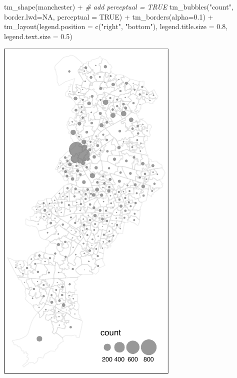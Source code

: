 \documentclass[
]{book}
\newenvironment{Shaded}{\begin{snugshade}}{\end{snugshade}}
\newcommand{\AttributeTok}[1]{\textcolor[rgb]{0.77,0.63,0.00}{#1}}
\newcommand{\CommentTok}[1]{\textcolor[rgb]{0.56,0.35,0.01}{\textit{#1}}}
\newcommand{\ConstantTok}[1]{\textcolor[rgb]{0.00,0.00,0.00}{#1}}
\newcommand{\FloatTok}[1]{\textcolor[rgb]{0.00,0.00,0.81}{#1}}
\newcommand{\FunctionTok}[1]{\textcolor[rgb]{0.00,0.00,0.00}{#1}}
\newcommand{\NormalTok}[1]{#1}
\newcommand{\SpecialCharTok}[1]{\textcolor[rgb]{0.00,0.00,0.00}{#1}}
\newcommand{\StringTok}[1]{\textcolor[rgb]{0.31,0.60,0.02}{#1}}
\begin{document}
\begin{Shaded}
\begin{Highlighting}[]
\FunctionTok{tm\_shape}\NormalTok{(manchester) }\SpecialCharTok{+}  
  \CommentTok{\# add perceptual = TRUE}
  \FunctionTok{tm\_bubbles}\NormalTok{(}\StringTok{"count"}\NormalTok{, }\AttributeTok{border.lwd=}\ConstantTok{NA}\NormalTok{, }\AttributeTok{perceptual =} \ConstantTok{TRUE}\NormalTok{) }\SpecialCharTok{+} 
  \FunctionTok{tm\_borders}\NormalTok{(}\AttributeTok{alpha=}\FloatTok{0.1}\NormalTok{) }\SpecialCharTok{+}                           
  \FunctionTok{tm\_layout}\NormalTok{(}\AttributeTok{legend.position =} \FunctionTok{c}\NormalTok{(}\StringTok{"right"}\NormalTok{, }\StringTok{"bottom"}\NormalTok{), }
            \AttributeTok{legend.title.size =} \FloatTok{0.8}\NormalTok{,}
            \AttributeTok{legend.text.size =} \FloatTok{0.5}\NormalTok{)}
\end{Highlighting}
\end{Shaded}

\includegraphics{crime_mapping_files/figure-latex/unnamed-chunk-80-1.pdf}
\end{document}
